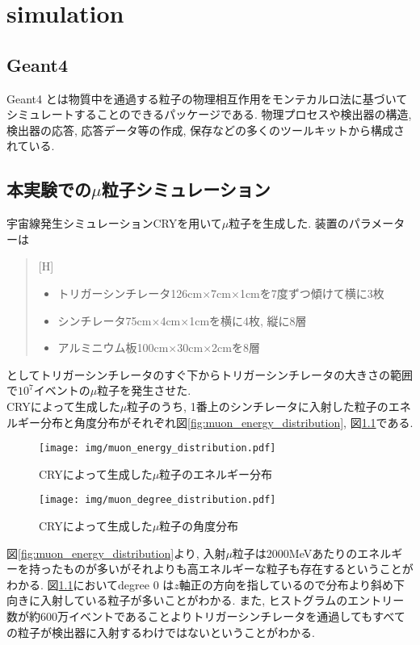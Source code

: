 \chapter{simulation}\label{simulation}
\section{Geant4}
Geant4 とは物質中を通過する粒子の物理相互作用をモンテカルロ法に基づいてシミュレートすることのできるパッケージである.
物理プロセスや検出器の構造, 検出器の応答, 応答データ等の作成, 保存などの多くのツールキットから構成されている.

\section{本実験での$\mu$粒子シミュレーション}
宇宙線発生シミュレーションCRYを用いて$\mu$粒子を生成した.
装置のパラメーターは
\begin{quote}[H]
    \begin{itemize}
        \item トリガーシンチレータ126cm$\times$7cm$\times$1cmを7度ずつ傾けて横に3枚
        \item シンチレータ75cm$\times$4cm$\times$1cmを横に4枚, 縦に8層
        \item アルミニウム板100cm$\times$30cm$\times$2cmを8層
    \end{itemize}
\end{quote}
としてトリガーシンチレータのすぐ下からトリガーシンチレータの大きさの範囲で$10^{7}$イベントの$\mu$粒子を発生させた.
\\
CRYによって生成した$\mu$粒子のうち, 
1番上のシンチレータに入射した粒子のエネルギー分布と角度分布がそれぞれ図\ref{fig:muon_energy_distribution}, 図\ref{fig:muon_degree_distribution}である.
\begin{figure}[H]
    \begin{minipage}[b]{0.47\linewidth}
        \centering
        \texttt{[image: img/muon\_energy\_distribution.pdf]}
        \caption{CRYによって生成した$\mu$粒子のエネルギー分布}
        \label{fig:muon_energy_distribution}
    \end{minipage}
    \begin{minipage}[b]{0.47\linewidth}
        \centering
        \texttt{[image: img/muon\_degree\_distribution.pdf]}
        \caption{CRYによって生成した$\mu$粒子の角度分布}
        \label{fig:muon_degree_distribution}
    \end{minipage}
\end{figure}
図\ref{fig:muon_energy_distribution}より, 入射$\mu$粒子は2000MeVあたりのエネルギーを持ったものが多いがそれよりも高エネルギーな粒子も存在するということがわかる.
図\ref{fig:muon_degree_distribution}においてdegree 0 は$z$軸正の方向を指しているので分布より斜め下向きに入射している粒子が多いことがわかる.
また, ヒストグラムのエントリー数が約600万イベントであることよりトリガーシンチレータを通過してもすべての粒子が検出器に入射するわけではないということがわかる.

